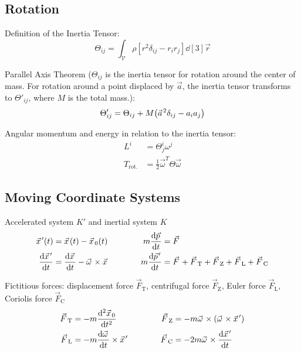 	\subsection{Rotation}
		\noindent
		Definition of the Inertia Tensor:
		\begin{equation}
			\Theta_{ij}=\int_{\mathcal{V}} \rho \left[r^2\delta_{ij}-r_i r_j\right] \dd[3]{\vec{r}}
		\end{equation}

		\noindent
		Parallel Axis Theorem ($\Theta_{ij}$ is the inertia tensor for rotation around the center of mass.
		For rotation around a point displaced by $\vec{a}$, the inertia tensor transforms to $\Theta'_{ij}$, where $M$ is the total mass.):
		\begin{equation}
			\Theta'_{ij} = \Theta_{ij} + M\qty(\vec{a}^2\delta_{ij} - a_i a_j)
		\end{equation}

		\noindent
		Angular momentum and energy in relation to the inertia tensor:
		\begin{equation}
			\begin{aligned}
				L^i &= \Theta^i_j \omega^j \\
				T_{\text{rot.}} &= \frac{1}{2}\vec{\omega}^T \Theta \vec{\omega}
			\end{aligned}
		\end{equation}

	\subsection{Moving Coordinate Systems}
		\noindent
		Accelerated system $K'$ and inertial system $K$
		\begin{equation}
			\begin{aligned}
				\vec{x}'(t) &= \vec{x}(t)-\vec{x}_0(t) &\hsp
				m\dv{\vec{p}}{t} &= \vec{F} \\
				\dv{\vec{x}'}{t} &= \dv{\vec{x}}{t}-\vec{\omega}\times\vec{x} &\hsp
				m\dv{\vec{p}'}{t} &= \vec{F} + \vec{F}_\text{T} + \vec{F}_\text{Z} + \vec{F}_\text{L} + \vec{F}_\text{C} \\
			\end{aligned}
		\end{equation}

		\noindent
		Fictitious forces: displacement force $\vec{F}_\text{T}$, centrifugal force $\vec{F}_\text{Z}$, Euler force $\vec{F}_\text{L}$, Coriolis force $\vec{F}_\text{C}$
		\begin{equation}
			\begin{aligned}
				\vec{F}_\text{T} &= -m\dv[2]{\vec{x}_0}{t} &\hsp
				\vec{F}_\text{Z} &= -m\vec{\omega}\times\qty(\vec{\omega}\times\vec{x}') \\
				\vec{F}_\text{L} &= -m\dv{\vec{\omega}}{t}\times\vec{x}' &\hsp
				\vec{F}_\text{C} &= -2m\vec{\omega}\times\dv{\vec{x}'}{t} \\
			\end{aligned}
		\end{equation}


